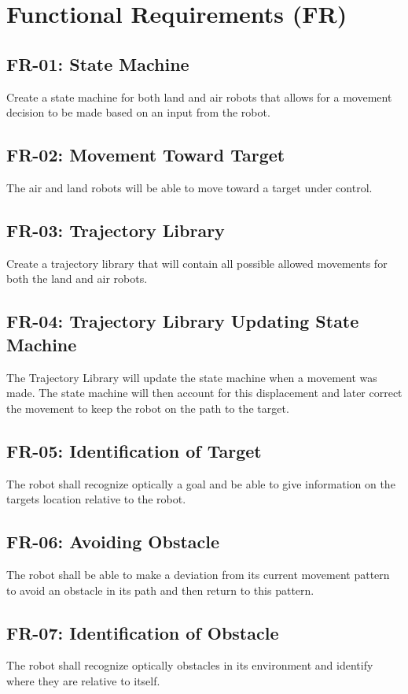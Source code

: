 \documentclass[]{report}
\begin{document}
\section{Functional Requirements (FR)}

\subsection{FR-01: State Machine}
Create a state machine for both land and air robots that allows for a movement decision to be made based on an input from the robot. 

\subsection{FR-02: Movement Toward Target}
The air and land robots will be able to move toward a target under control.

\subsection{FR-03: Trajectory Library}
Create a trajectory library that will contain all possible allowed movements for both the land and air robots.

\subsection{FR-04: Trajectory Library Updating State Machine}
The Trajectory Library will update the state machine when a movement was made. The state machine will then account for this displacement and later correct the movement to keep the robot on the path to the target.

\subsection{FR-05: Identification of Target}
The robot shall recognize optically a goal and be able to give information on the targets location relative to the robot. 

\subsection{FR-06: Avoiding Obstacle}
The robot shall be able to make a deviation from its current movement pattern to avoid an obstacle in its path and then return to this pattern.

\subsection{FR-07: Identification of Obstacle}
The robot shall recognize optically obstacles in its environment and identify where they are relative to itself.
\end{document}
